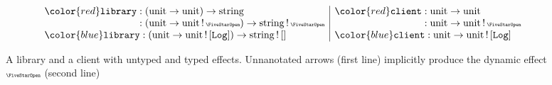\newcommand\ruledef{::=}
\newcommand\rulealt{\;|\;}
\newcommand\tyarr[2]{#1 \to #2}
\newcommand\tyany{\star}
\newcommand\cty[2]{#2 ! #1}
\newcommand\tynat{\mathrm{nat}}
\newcommand\tybool{\mathrm{bool}}
\newcommand\tyunit{\mathrm{unit}}
\newcommand\tystring{\mathrm{string}}
\newcommand\effany{\mbox{\tiny\FiveStarOpen}}
\newcommand\effop{\mathit{op}}
\newcommand\app[2]{#1\,#2}
\newcommand\lam[2]{\lambda\, #1 .\, #2}
\newcommand\cast[2]{#1 \,\MVAt\, #2}
\newcommand\tbox[2]{#1 \Uparrow #2}
\newcommand\blame{\mathrm{blame}}
\newcommand\perform[2]{#1\left(#2\right)}
\newcommand\handle[2]{\mathbf{handle}\,\{#1\}\,#2}
\newcommand\fori[3]{(#3)_{#1=1\dots #2}}
\newcommand\foriset[3]{\{#3\}_{#1=1\dots #2}}
\newcommand\treturn[1]{\mathbf{return}\,#1}
\newcommand\stepto{\longrightarrow}
\newcommand\stepsto{\stepto^\ast}
\newcommand\subst[3]{#1[#2/#3]}
\newcommand\context[2]{#1[#2]}
\newcommand\xC{\mathcal{C}}
\newcommand\xE{\mathcal{E}}
\newcommand\xP{\mathcal{P}}
\newcommand\bound[1]{\mathbf{bound}(#1)}
\newcommand\cid{\mathrm{id}}
\newcommand\commutel[3]{\mathbf{commutes}^l(#1,#2,#3)}
\newcommand\commuter[3]{\mathbf{commutes}^r(#1,#2,#3)}
\newcommand\cod[1]{\mathrm{cod}(#1)}
\newcommand\codeff[1]{\mathrm{eff}(#1)}
\newcommand\dom[1]{\mathrm{dom}(#1)}
\newcommand\typeof[1]{\mathrm{typeof}(#1)}
\newcommand\dprime{{\prime\prime}}

\newcommand\Term[3]{#1 \vdash #2 : #3}
\newcommand\TermP[4]{#1 \vdash #2 \le #3 : #4}

\newcommand\dhandler{{\color{red}\texttt{library}}}
\newcommand\shandler{{\color{blue}\texttt{library}}}
\newcommand\dclient{{\color{red}\texttt{client}}}
\newcommand\sclient{{\color{blue}\texttt{client}}}

\newcommand\eflog{{[\texttt{Log}]}}
\newcommand\efnone{[]}

\begin{figure}
$$
\begin{array}{l|l}
  \dhandler : (\tyunit \to \tyunit) \to \tystring & \dclient : \tyunit \to \tyunit \\
  \hphantom{\dhandler} : (\tyunit \to \tyunit\,!\,\effany) \to \tystring\,!\,\effany & \hphantom{\dclient} : \tyunit \to \tyunit\,!\,\effany \\
  \shandler : (\tyunit \to \tyunit\,!\,\eflog) \to \tystring \,!\, \efnone & \sclient : \tyunit \to \tyunit\,!\,\eflog
\end{array}
$$
  \caption{A library and a client with {\color{red}untyped} and {\color{blue}typed} effects. Unnanotated arrows (first line) implicitly produce the dynamic effect $\effany$ (second line)}
\label{fig:app-example}
\end{figure}

